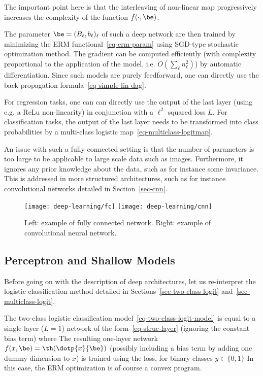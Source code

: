 The important point here is that the interleaving of non-linear map progressively increases the complexity of the function $f(\cdot,\be)$.

The parameter $\be = (B_\ell,b_\ell)_\ell$ of such a deep network are then trained by minimizing the ERM functional~\eqref{eq-erm-param} using SGD-type stochastic optimization method. The gradient can be computed efficiently (with complexity proportional to the application of the model, i.e. $O(\sum_\ell n_\ell^2)$) by automatic differentiation. Since such models are purely feedforward, one can directly use the back-propagation formula~\eqref{eq-simple-lin-dag}.

For regression tasks, one can can directly use the output of the last layer (using e.g. a ReLu non-linearity) in conjunction with a $\ell^2$ squared loss $L$.
%
For classification tasks, the output of the last layer needs to be transformed into class probabilities by a multi-class logistic map~\eqref{eq-multiclass-logitmap}.

An issue with such a fully connected setting is that the number of parameters is too large to be applicable to large scale data such as images. Furthermore, it ignores any prior knowledge about the data, such as for instance some invariance. This is addressed in more structured architectures, such as for instance convolutional networks detailed in Section~\ref{sec-cnn}. 


\begin{figure}
\texttt{[image: deep-learning/fc]} \quad
\texttt{[image: deep-learning/cnn]}
\caption{\label{fig-bgd}
Left: example of fully connected network.
Right: example of convolutional neural network.
}
\end{figure}

\subsection{Perceptron and Shallow Models}

Before going on with the description of deep architectures, let us re-interpret the logistic classification method detailed in Sections~\ref{sec-two-class-logit} and~\ref{sec-multiclass-logit}.

The two-class logistic classification model~\eqref{eq-two-class-logit-model} is equal to a single layer ($L=1$) network of the form~\eqref{eq-struc-layer} (ignoring the constant bias term) where 
The resulting one-layer network $f(x,\be) = \th(\dotp{x}{\be})$ (possibly including a bias term by adding one dummy dimension to $x$) is trained using the loss, for binary classes $y \in \{0,1\}$ 
In this case, the ERM optimization is of course a convex program. 

